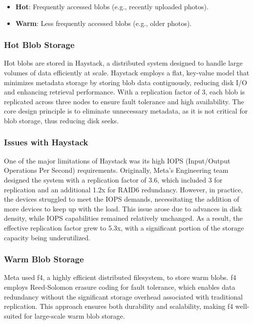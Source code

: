 \begin{itemize}\label{blob_categories}
    \item \textbf{Hot}: Frequently accessed blobs (e.g., recently uploaded photos).
    \item \textbf{Warm}: Less frequently accessed blobs (e.g., older photos).
\end{itemize}

\subsubsection*{Hot Blob Storage}\label{sec:hot_blob_storage}

Hot blobs are stored in Haystack\cite{haystack}, a distributed system designed to handle large volumes of data efficiently at scale. Haystack employs a flat, key-value model that minimizes metadata storage by storing blob data contiguously, reducing disk I/O and enhancing retrieval performance. With a replication factor of 3, each blob is replicated across three nodes to ensure fault tolerance and high availability. The core design principle is to eliminate unnecessary metadata, as it is not critical for blob storage, thus reducing disk seeks.

\subsubsection*{Issues with Haystack}\label{sec:haystack_issues}
One of the major limitations of Haystack was its high IOPS (Input/Output Operations Per Second) requirements. Originally, Meta's Engineering team designed the system with a replication factor of 3.6, which included 3 for replication and an additional 1.2x for RAID6 redundancy. However, in practice, the devices struggled to meet the IOPS demands, necessitating the addition of more devices to keep up with the load. This issue arose due to advances in disk density, while IOPS capabilities remained relatively unchanged. As a result, the effective replication factor grew to 5.3x, with a significant portion of the storage capacity being underutilized.

\subsubsection*{Warm Blob Storage}\label{sec:warm_blob_storage}
Meta used f4\cite{f4}, a highly efficient distributed filesystem, to store warm blobs. f4 employs Reed-Solomon erasure coding\cite{ReedSolomon1960} for fault tolerance, which enables data redundancy without the significant storage overhead associated with traditional replication. This approach ensures both durability and scalability, making f4 well-suited for large-scale warm blob storage.

